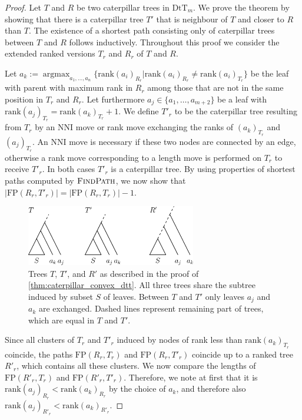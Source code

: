 \documentclass[11pt]{amsart}
\newcommand{\findpath}{\textsc{FindPath}}
\newcommand{\rank}{\mathrm{rank}}
\newcommand{\nni}{\mathrm{NNI}}
\newcommand{\fp}{\mathrm{FP}}
\newcommand{\dtt}{\mathrm{DtT}}
\DeclareMathOperator*{\argmax}{argmax}
\begin{document}
\begin{proof}
	Let $T$ and $R$ be two caterpillar trees in $\dtt_m$.
	We prove the theorem by showing that there is a caterpillar tree $T'$ that is neighbour of $T$ and closer to $R$ than $T$.
	The existence of a shortest path consisting only of caterpillar trees between $T$ and $R$ follows inductively.
	Throughout this proof we consider the extended ranked versions $T_r$ and $R_r$ of $T$ and $R$.

	Let $a_k := \argmax_{a_1, \ldots, a_n}\{\rank(a_i)_{R_r} | \rank(a_i)_{R_r} \neq \rank(a_i)_{T_r}\}$ be the leaf with parent with maximum rank in $R_r$ among those that are not in the same position in $T_r$ and $R_r$.
	Let furthermore $a_j \in \{a_1, \ldots, a_{m+2}\}$ be a leaf with $\rank(a_j)_{T_r} = \rank(a_k)_{T_r} + 1$.
	We define $T'_r$ to be the caterpillar tree resulting from $T_r$ by an $\nni$ move or rank move exchanging the ranks of $(a_k)_{T_r}$ and $(a_j)_{T_r}$.
	An $\nni$ move is necessary if these two nodes are connected by an edge, otherwise a rank move corresponding to a length move is performed on $T_r$ to receive $T'_r$.
	In both cases $T'_r$ is a caterpillar tree.
	By using properties of shortest paths computed by $\findpath$, we now show that $|\fp(R_r,T'_r)| = |\fp(R_r,T_r)| - 1$.

	\todo{update this figure to $\dtt_m$}
	\begin{figure}[ht]
		\includegraphics[width=0.66\textwidth]{proof_caterpillar_convex_rnni.eps}
		\caption{Trees $T$, $T'$, and $R'$ as described in the proof of \autoref{thm:caterpillar_convex_dtt}.
		All three trees share the subtree induced by subset $S$ of leaves.
		Between $T$ and $T'$ only leaves $a_j$ and $a_k$ are exchanged.
		Dashed lines represent remaining part of trees, which are equal in $T$ and $T'$.}
		\label{fig:proof_caterpillar_convex_rnni}
	\end{figure}

	Since all clusters of $T_r$ and $T'_r$ induced by nodes of rank less than $\rank(a_k)_{T_r}$ coincide, the paths $\fp(R_r,T_r)$ and $\fp(R_r,T'_r)$ coincide up to a ranked tree $R'_r$, which contains all these clusters.
	We now compare the lengths of $\fp(R'_r,T_r)$ and $\fp(R'_r,T'_r)$.
	Therefore, we note at first that it is $\rank(a_j)_{R_r} < \rank(a_k)_{R_r}$ by the choice of $a_k$, and therefore also $\rank(a_j)_{R'_r} < \rank(a_k)_{R'_r}$.


\end{proof}
\end{document}
